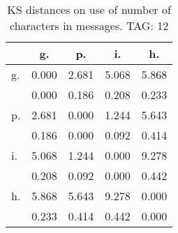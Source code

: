 \begin{table}[h!]
\begin{center}
\begin{tabular}{| l | c | c | c | c |}\hline
 & g. & p. & i. & h. \\\hline
g. & 0.000  & 2.681  & 5.068  & 5.868 \\\hline
 & 0.000  & 0.186  & 0.208  & 0.233 \\\hline
p. & 2.681  & 0.000  & 1.244  & 5.643 \\\hline
 & 0.186  & 0.000  & 0.092  & 0.414 \\\hline
i. & 5.068  & 1.244  & 0.000  & 9.278 \\\hline
 & 0.208  & 0.092  & 0.000  & 0.442 \\\hline
h. & 5.868  & 5.643  & 9.278  & 0.000 \\\hline
 & 0.233  & 0.414  & 0.442  & 0.000 \\\hline
\end{tabular}
\caption{KS distances on use of number of characters in messages. TAG: 12}
\end{center}
\end{table}